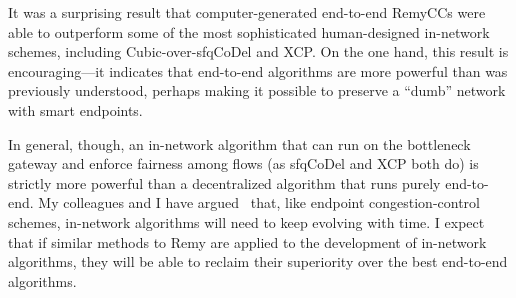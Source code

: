 It was a surprising result that computer-generated end-to-end RemyCCs
were able to outperform some of the most sophisticated human-designed
in-network schemes, including Cubic-over-sfqCoDel and XCP. On the one
hand, this result is encouraging---it indicates that end-to-end
algorithms are more powerful than was previously understood,
perhaps making it possible to preserve a ``dumb'' network with smart endpoints.

In general, though, an in-network algorithm that can run on the
bottleneck gateway and enforce fairness among flows (as sfqCoDel and
XCP both do) is strictly more powerful than a decentralized algorithm
that runs purely end-to-end. My colleagues and I have
argued~\cite{sivaraman2013no} that, like endpoint congestion-control
schemes, in-network algorithms will need to keep evolving with time. I
expect that if similar methods to Remy are applied to the development
of in-network algorithms, they will be able to reclaim their
superiority over the best end-to-end algorithms.
